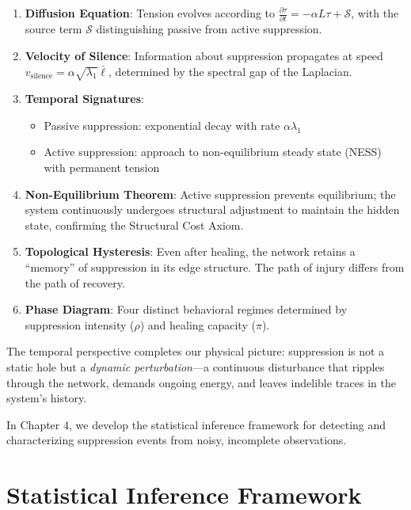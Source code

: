 \documentclass[12pt,a4paper]{article}
\theoremstyle{definition}
\theoremstyle{remark}
\begin{document}
\begin{enumerate}
    \item \textbf{Diffusion Equation}: Tension evolves according to $\frac{\partial \tau}{\partial t} = -\alpha L\tau + \mathcal{S}$, with the source term $\mathcal{S}$ distinguishing passive from active suppression.
    
    \item \textbf{Velocity of Silence}: Information about suppression propagates at speed $v_{\text{silence}} = \alpha\sqrt{\lambda_1}\bar{\ell}$, determined by the spectral gap of the Laplacian.
    
    \item \textbf{Temporal Signatures}: 
    \begin{itemize}
        \item Passive suppression: exponential decay with rate $\alpha\lambda_1$
        \item Active suppression: approach to non-equilibrium steady state (NESS) with permanent tension
    \end{itemize}
    
    \item \textbf{Non-Equilibrium Theorem}: Active suppression prevents equilibrium; the system continuously undergoes structural adjustment to maintain the hidden state, confirming the Structural Cost Axiom.
    
    \item \textbf{Topological Hysteresis}: Even after healing, the network retains a ``memory'' of suppression in its edge structure. The path of injury differs from the path of recovery.
    
    \item \textbf{Phase Diagram}: Four distinct behavioral regimes determined by suppression intensity ($\rho$) and healing capacity ($\pi$).
\end{enumerate}

The temporal perspective completes our physical picture: suppression is not a static hole but a \emph{dynamic perturbation}—a continuous disturbance that ripples through the network, demands ongoing energy, and leaves indelible traces in the system's history.

In Chapter 4, we develop the statistical inference framework for detecting and characterizing suppression events from noisy, incomplete observations.

\newpage
\section{Statistical Inference Framework}
\end{document}
